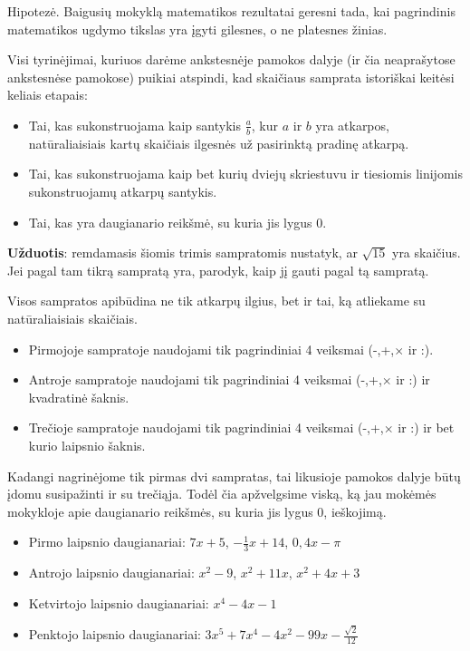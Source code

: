 \documentclass{article}
\begin{document}
\begin{mdframed}[backgroundcolor=blue!5!white]
Hipotezė. Baigusių mokyklą matematikos rezultatai geresni tada, kai pagrindinis matematikos ugdymo tikslas yra įgyti gilesnes, o ne platesnes žinias.
\end{mdframed}

Visi tyrinėjimai, kuriuos darėme ankstesnėje pamokos dalyje (ir čia neaprašytose ankstesnėse pamokose) puikiai atspindi, kad skaičiaus samprata istoriškai keitėsi keliais etapais:
\begin{itemize}
\item Tai, kas sukonstruojama kaip santykis $\frac{a}{b}$, kur $a$ ir $b$ yra atkarpos, natūraliaisiais kartų skaičiais ilgesnės už pasirinktą pradinę atkarpą.
\item Tai, kas sukonstruojama kaip bet kurių dviejų skriestuvu ir tiesiomis linijomis sukonstruojamų atkarpų santykis.
\item Tai, kas yra daugianario reikšmė, su kuria jis lygus 0.
\end{itemize}

\textbf{Užduotis}: remdamasis šiomis trimis sampratomis nustatyk, ar $\sqrt{15}$ yra skaičius. Jei pagal tam tikrą sampratą yra, parodyk, kaip jį gauti pagal tą sampratą.

Visos sampratos apibūdina ne tik atkarpų ilgius, bet ir tai, ką atliekame su natūraliaisiais skaičiais.
\begin{itemize}
\item Pirmojoje sampratoje naudojami tik pagrindiniai 4 veiksmai (-,+,$\times$ ir :).
\item Antroje sampratoje naudojami tik pagrindiniai 4 veiksmai (-,+,$\times$ ir :) ir kvadratinė šaknis.
\item Trečioje sampratoje naudojami tik pagrindiniai 4 veiksmai (-,+,$\times$ ir :) ir bet kurio laipsnio šaknis.
\end{itemize}

Kadangi nagrinėjome tik pirmas dvi sampratas, tai likusioje pamokos dalyje būtų įdomu susipažinti ir su trečiąja. Todėl čia apžvelgsime viską, ką jau mokėmės mokykloje apie daugianario reikšmės, su kuria jis lygus 0, ieškojimą.

\begin{itemize}
\item Pirmo laipsnio daugianariai: $7x+5$, $-\frac{1}{3}x+14$, $0,4x-\pi$
\item Antrojo laipsnio daugianariai: $x^2-9$, $x^2+11x$, $x^2+4x+3$
\item Ketvirtojo laipsnio daugianariai: $x^4-4x-1$
\item Penktojo laipsnio daugianariai: $3x^5+7x^4-4x^2-99x-\frac{\sqrt{2}}{12}$
\end{itemize}
\end{document}
